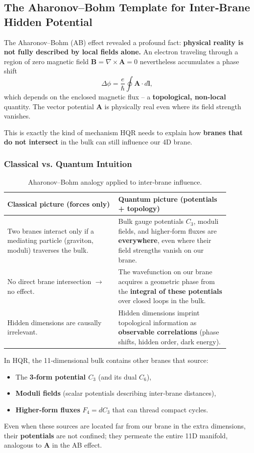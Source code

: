 \subsection{The Aharonov–Bohm Template for Inter‑Brane Hidden Potential}

The Aharonov–Bohm (AB) effect \cite{AharonovBohm1959} revealed a profound fact: 
\textbf{physical reality is not fully described by local fields alone.} 
An electron traveling through a region of zero magnetic field 
$\mathbf{B} = \nabla \times \mathbf{A} = 0$ nevertheless accumulates a phase shift
\[
\Delta \phi = \frac{e}{\hbar} \oint \mathbf{A} \cdot d\mathbf{l},
\]
which depends on the enclosed magnetic flux – a \textbf{topological, non‑local} quantity. 
The vector potential $\mathbf{A}$ is physically real even where its field strength vanishes.

This is exactly the kind of mechanism HQR needs to explain how 
\textbf{branes that do not intersect} in the bulk can still influence our 4D brane.

\subsubsection*{Classical vs. Quantum Intuition}

\begin{table}[h]
\centering
\begin{tabular}{|p{0.45\linewidth}|p{0.45\linewidth}|}
\hline
\textbf{Classical picture (forces only)} & \textbf{Quantum picture (potentials + topology)} \\
\hline
Two branes interact only if a mediating particle (graviton, moduli) traverses the bulk. &
Bulk gauge potentials $C_3$, moduli fields, and higher‑form fluxes are \textbf{everywhere},
even where their field strengths vanish on our brane. \\
\hline
No direct brane intersection $\rightarrow$ no effect. &
The wavefunction on our brane acquires a geometric phase from the \textbf{integral of these potentials}
over closed loops in the bulk. \\
\hline
Hidden dimensions are causally irrelevant. &
Hidden dimensions imprint topological information as \textbf{observable correlations}
(phase shifts, hidden order, dark energy). \\
\hline
\end{tabular}
\caption{Aharonov–Bohm analogy applied to inter‑brane influence.}
\end{table}

In HQR, the 11‑dimensional bulk contains other branes that source:
\begin{itemize}
\item The \textbf{3‑form potential $C_3$} (and its dual $C_6$),
\item \textbf{Moduli fields} (scalar potentials describing inter‑brane distances),
\item \textbf{Higher‑form fluxes} $F_4 = dC_3$ that can thread compact cycles.
\end{itemize}
Even when these sources are located far from our brane in the extra dimensions, their
\textbf{potentials} are not confined; they permeate the entire 11D manifold, analogous to $\mathbf{A}$ in the AB effect.

